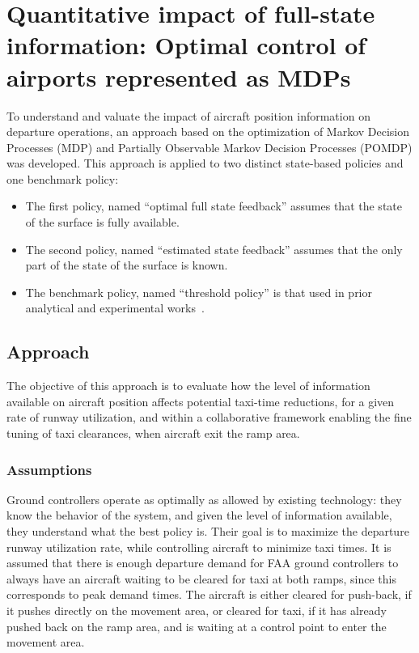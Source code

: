 \documentclass[letterpaper]{article}
\begin{document}
\section{Quantitative impact of full-state information: Optimal control of airports represented as MDPs}
\label{quantitative}

To understand and valuate the impact of aircraft position information on departure operations, an approach based on the optimization of Markov Decision Processes (MDP) and Partially Observable Markov Decision Processes (POMDP) was developed. This approach is applied to two distinct state-based policies and one benchmark policy:
\begin{itemize}
\item The first policy, named ``optimal full state feedback'' assumes that the state of the surface is fully available.
\item The second policy, named ``estimated state feedback'' assumes that the only part of the state of the surface is known.
\item The benchmark policy, named ``threshold policy'' is that used in prior analytical and experimental works~\cite{log99,SKB:11}.
\end{itemize}

\subsection{Approach} \label{theappraoch}


The objective of this approach is to evaluate how the level of information available on aircraft position affects potential taxi-time reductions, for a given rate of runway utilization, and within a collaborative framework enabling the fine tuning of taxi clearances, when aircraft exit the ramp area.

\subsubsection{Assumptions}
Ground controllers operate as optimally as allowed by existing technology: they know the behavior of the system, and given the level of information available, they understand what the best policy is. Their goal is to maximize the departure runway utilization rate, while controlling aircraft to minimize taxi times. It is assumed that there is enough departure demand for FAA ground controllers to always have an aircraft waiting to be cleared for taxi at both ramps, since this corresponds to peak demand times. The aircraft is either cleared for push-back, if it pushes directly on the movement area, or cleared for taxi, if it has already pushed back on the ramp area, and is waiting at a control point to enter the movement area.
\end{document}
